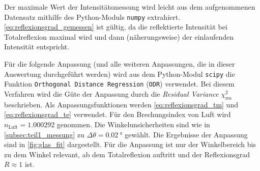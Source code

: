 Der maximale Wert der Intensitätsmessung wird leicht aus dem aufgenommenen Datensatz mithilfe des Python-Moduls \texttt{numpy} extrahiert. \cref{eq:reflexionsgrad_gemessen}
ist gültig, da die reflektierte Intensität bei Totalreflexion maximal wird und dann (näherungsweise) der einlaufenden Intensität entspricht.\par
Für die folgende Anpassung (und alle weiteren Anpassungen, die in dieser Auswertung durchgeführt werden) wird aus dem Python-Modul \texttt{scipy} die Funktion
\texttt{Orthogonal Distance Regression} (\texttt{ODR}) verwendet. Bei diesem Verfahren wird die Güte der Anpassung durch die \textit{Residual Variance} $\chi_{\mathrm{res}}^2$
beschrieben. Als Anpassungsfunktionen werden \cref{eq:reflexionsgrad_tm} und \cref{eq:reflexionsgrad_te} verwendet. Für den Brechungsindex von Luft wird
$n_{\mathrm{Luft}} = 1.000292$ \cite{wiki:brechungsindex} genommen. Die Winkelunsicherheiten sind wie in \cref{subsec:teil1_messung} zu $\Delta \theta = \SI{0,02}{\degree}$
gewählt. Die Ergebnisse der Anpassung sind in \cref{fig:glas_fit} dargestellt. Für die Anpassung ist nur der Winkelbereich bis zu dem Winkel relevant, ab dem Totalreflexion auftritt und der
Reflexionsgrad $R \approx 1$ ist.
